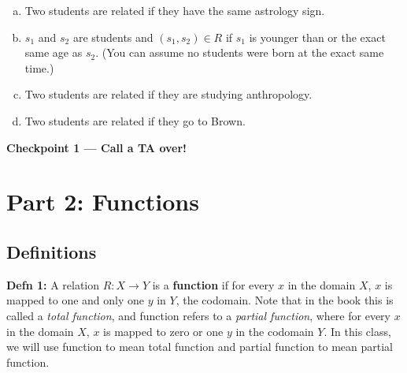 \documentclass[12pt,letterpaper]{article}
\begin{document}
\begin{enumerate}[1.]
		\begin{enumerate}[a.]
			\item Two students are related if they have the same astrology sign.

				\begin{mdframed} \vspace{2.5cm} \end{mdframed}


			\item$s_1$ and $s_2$ are students and $(s_1,s_2) \in R$ if $s_1$ is younger than or the exact same age as $s_2$. (You can assume no students were born at the exact same time.)

				\begin{mdframed} \vspace{2.5cm} \end{mdframed}

		\item Two students are related if they are studying anthropology.
		
				\begin{mdframed} \vspace{2.5cm} \end{mdframed}

	  	\item Two students are related if they go to Brown.
				\begin{mdframed} \vspace{2.5cm} \end{mdframed}
		\end{enumerate}
    
\end{enumerate}

\textbf{Checkpoint 1 — Call a TA over!}

\newpage

	\section*{Part 2: Functions}

      \subsection*{Definitions}

      \textbf{Defn 1:} A relation $R: X\rightarrow Y$ is a \textbf{function} if for every $x$ in the domain $X$, $x$ is mapped to one and only one $y$ in $Y$, the codomain. Note that in the book this is called a \textit{total function}, and function refers to a \textit{partial function}, where for every $x$ in the domain $X$, $x$ is mapped to zero or one $y$ in the codomain $Y$. In this class, we will use function to mean total function and partial function to mean partial function.
\end{document}
